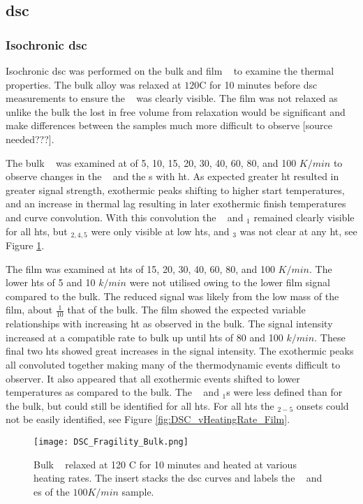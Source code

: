 \documentclass[draft,a4paper,12pt,oneside]{article}%
\begin{document}
\subsection{\acrshort{dsc}}
\subsubsection{Isochronic \acrshort{dsc}}
Isochronic \acrshort{dsc} was performed on the bulk and film \MgZnCa~ to examine the thermal properties. The bulk alloy was relaxed at $120$\degree C for 10 minutes before \acrshort{dsc} measurements to ensure the \Tg~ was clearly visible. The film was not relaxed as unlike the bulk the lost in free volume from relaxation would be significant and make differences between the samples much more difficult to observe [source needed???]. 

The bulk \MgZnCa~ was examined at  of 5, 10, 15, 20, 30, 40, 60, 80, and 100 $K/min$ to observe changes in the \Tg~ and the \Tx s with \gls{ht}. As expected greater \gls{ht} resulted in greater signal strength, exothermic peaks shifting to higher start temperatures, and an increase in thermal lag resulting in later exothermic finish temperatures and curve convolution. With this convolution the \Tg~ and \Tx $_{1}$  remained clearly visible for all \glspl{ht}, but \Tx $_{2,4,5}$ were only visible at low \glspl{ht}, and \Tx $_{3}$ was not clear at any \gls{ht}, see Figure \ref{fig:DSC_vHeatingRate_Bulk}.

The film was examined at \glspl{ht} of 15, 20, 30, 40, 60, 80, and 100 $K/min$. The lower \glspl{ht} of 5 and 10 $k/min$ were not utilised owing to the lower film signal compared to the bulk. The reduced signal was likely from the low mass of the film, about $\frac{1}{10}$ that of the bulk. The film showed the expected variable relationships with increasing \gls{ht} as observed in the bulk. The signal intensity increased at a compatible rate to bulk up until \glspl{ht} of 80 and 100 $k/min$. These final two \glspl{ht} showed great increases in the signal intensity. The exothermic peaks all convoluted together making many of the thermodynamic events difficult to observer. It also appeared that all exothermic events shifted to lower temperatures as compared to the bulk. The \Tg~ and \Tx $_{1}$s were less defined than for the bulk, but could still be identified for all \glspl{ht}. For all \glspl{ht} the \Tx $_{2-5}$ onsets could not be easily identified, see Figure \ref{fig:DSC_vHeatingRate_Film}.

\begin{figure}[b]
	\centering
	\texttt{[image: DSC\_Fragility\_Bulk.png]}
	\caption[Table of contents Capition]{Bulk \MgZnCa~ relaxed at 120 \degree C for 10 minutes and heated at various heating rates. The insert stacks the \gls{dsc} curves and labels the \Tg~ and \Tx es of the $100 K/min$ sample.}%
	\label{fig:DSC_vHeatingRate_Bulk}
\end{figure}
\end{document}
